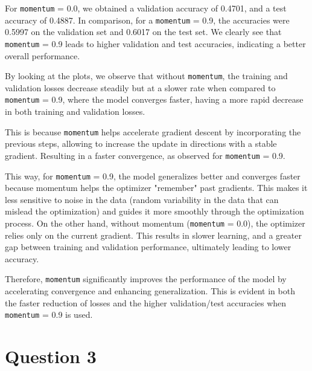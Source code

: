 \documentclass[a4paper, 12pt]{article}
\begin{document}
For \texttt{momentum} = 0.0, we obtained a validation accuracy of 0.4701, and a test accuracy of 0.4887. In comparison, for a \texttt{momentum} = 0.9, the accuracies were 0.5997 on the validation set and 0.6017 on the test set.  We clearly see that \texttt{momentum} = 0.9 leads to higher validation and test accuracies, indicating a better overall performance.

By looking at the plots, we observe that without \texttt{momentum}, the training and validation losses decrease steadily but at a slower rate when compared to \texttt{momentum} = 0.9, where 
the model converges faster, having a more rapid decrease in both training and validation losses.

This is because \texttt{momentum} helps accelerate gradient descent by incorporating the previous steps, allowing to increase the update in directions with a stable gradient. Resulting in a faster convergence, as observed for \texttt{momentum} = 0.9.

This way, for \texttt{momentum} = 0.9, the model generalizes better and converges faster because momentum helps the optimizer "remember" past gradients. This makes it less sensitive to noise in the data (random variability in the data that can mislead the optimization) and guides it more smoothly through the optimization process.  On the other hand, without momentum (\texttt{momentum} = 0.0), the optimizer relies only on the current gradient. This results in slower learning, and a greater gap between training and validation performance, ultimately leading to lower accuracy.

Therefore, \texttt{momentum} significantly improves the performance of the model by accelerating convergence and enhancing generalization. This is evident in both the faster reduction of losses and the higher validation/test accuracies when \texttt{momentum} = 0.9 is used.

\section*{Question 3}
\end{document}
